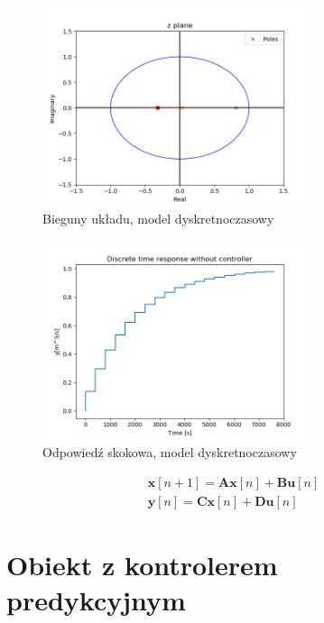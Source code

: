 \documentclass{article}
\begin{document}
\begin{figure}[H]
    \centering
    \includegraphics[width=0.7\textwidth]{img/disc_poles.png}
    \caption{Bieguny układu, model dyskretnoczasowy}
    \label{fig:disc_poles}
\end{figure}

\begin{figure}[H]
    \centering
    \includegraphics[width=0.7\textwidth]{img/step_resp_disc.png}
    \caption{Odpowiedź skokowa, model dyskretnoczasowy}
    \label{fig:step_resp_disc}
\end{figure}




\begin{equation}\label{eq:stan_disc}
 \begin{array}{l}
  \mathbf{x}[n+1] = \mathbf{A}\mathbf{x}[n] + \mathbf{B}\mathbf{u}[n] \\
  \mathbf{y}[n]= \mathbf{C} \mathbf{x}[n] + \mathbf{D}\mathbf{u}[n]
\end{array}
\end{equation}




\section{Obiekt z kontrolerem predykcyjnym}
\end{document}
